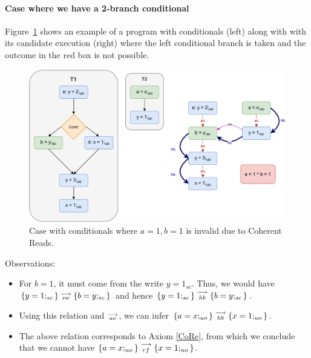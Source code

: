 
    \paragraph{Case where we have a 2-branch conditional}
    
    Figure~\ref{reord:cond_counter_example1(a)} shows an example of a program with conditionals (left) along with with its candidate execution (right) where the left conditional branch is taken and the outcome in the red box is not possible. 
    \begin{figure}[H]
        \centering 
        \includegraphics[scale=0.7]{7.CounterExamples/ReorderingConditionals/CounterExamples1a(Conditionals).pdf}
        \caption{Case with conditionals where $a = 1, b = 1$ is invalid due to Coherent Reads.}
        \label{reord:cond_counter_example1(a)}
    \end{figure}
    
    Observations:
    \begin{itemize}
        \item For $b=1$, it must come from the write $y=1_{sc}$. 
        Thus, we would have $\{y=1;_{sc}\}\stackrel{\longrightarrow}{_{sw}}\{b=y;_{sc}\}$ and hence $\{y=1;_{sc}\}\stackrel{\longrightarrow}{_{hb}}\{b=y;_{sc}\}$.
        \item Using this relation and $\stackrel{\longrightarrow}{_{ao}}$, we can infer $\{a=x;_{uo}\}\stackrel{\longrightarrow}{_{hb}}\{x=1;_{uo}\}$.
        \item The above relation corresponds to Axiom \ref{CoRe}, from which we conclude that we cannot have $\{a=x;_{uo}\}\stackrel{\longrightarrow}{_{rf}}\{x=1;_{uo}\}$.
    \end{itemize}
    
